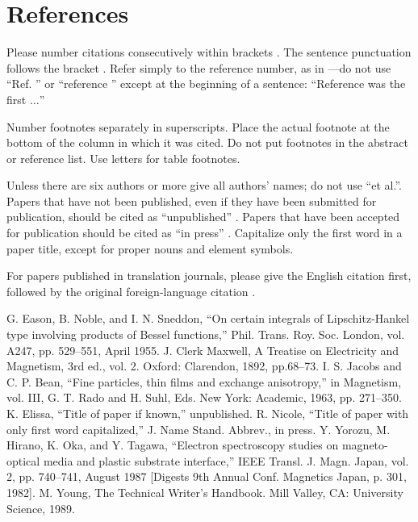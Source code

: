 \documentclass[conference]{IEEEtran}
\begin{document}
\section*{References}

Please number citations consecutively within brackets \cite{b1}. The 
sentence punctuation follows the bracket \cite{b2}. Refer simply to the reference 
number, as in \cite{b3}---do not use ``Ref. \cite{b3}'' or ``reference \cite{b3}'' except at 
the beginning of a sentence: ``Reference \cite{b3} was the first $\ldots$''

Number footnotes separately in superscripts. Place the actual footnote at 
the bottom of the column in which it was cited. Do not put footnotes in the 
abstract or reference list. Use letters for table footnotes.

Unless there are six authors or more give all authors' names; do not use 
``et al.''. Papers that have not been published, even if they have been 
submitted for publication, should be cited as ``unpublished'' \cite{b4}. Papers 
that have been accepted for publication should be cited as ``in press'' \cite{b5}. 
Capitalize only the first word in a paper title, except for proper nouns and 
element symbols.

For papers published in translation journals, please give the English 
citation first, followed by the original foreign-language citation \cite{b6}.

\begin{thebibliography}{00}
 G. Eason, B. Noble, and I. N. Sneddon, ``On certain integrals of Lipschitz-Hankel type involving products of Bessel functions,'' Phil. Trans. Roy. Soc. London, vol. A247, pp. 529--551, April 1955.
 J. Clerk Maxwell, A Treatise on Electricity and Magnetism, 3rd ed., vol. 2. Oxford: Clarendon, 1892, pp.68--73.
 I. S. Jacobs and C. P. Bean, ``Fine particles, thin films and exchange anisotropy,'' in Magnetism, vol. III, G. T. Rado and H. Suhl, Eds. New York: Academic, 1963, pp. 271--350.
 K. Elissa, ``Title of paper if known,'' unpublished.
 R. Nicole, ``Title of paper with only first word capitalized,'' J. Name Stand. Abbrev., in press.
 Y. Yorozu, M. Hirano, K. Oka, and Y. Tagawa, ``Electron spectroscopy studies on magneto-optical media and plastic substrate interface,'' IEEE Transl. J. Magn. Japan, vol. 2, pp. 740--741, August 1987 [Digests 9th Annual Conf. Magnetics Japan, p. 301, 1982].
 M. Young, The Technical Writer's Handbook. Mill Valley, CA: University Science, 1989.
\end{thebibliography}
\end{document}
